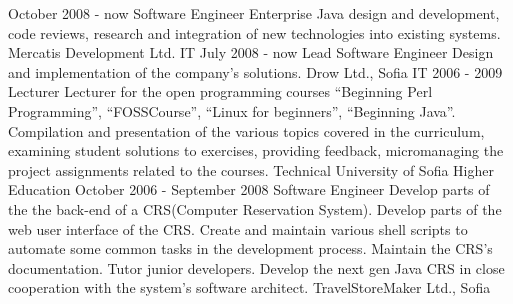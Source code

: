
{
  October 2008 - now
}
{
  Software Engineer
}
{
  Enterprise Java design and development, code reviews, research and
  integration of new technologies into existing systems.
}
{
  Mercatis Development Ltd.
}
{
  IT
}
\ecvitem{}{} %
\ecvitem{}{} %
{
  July 2008 - now
}
{
  Lead Software Engineer
}
{
  Design and implementation of the company's solutions.
}
{
  Drow Ltd., Sofia
}
{
  IT
}
\ecvitem{}{} %
\ecvitem{}{} %
{
  2006 - 2009
}
{
  Lecturer
}
{
  Lecturer for the open programming courses
  ``Beginning Perl Programming'', ``FOSSCourse'', ``Linux for
  beginners'', ``Beginning Java''. Compilation and presentation of the various topics covered in
  the curriculum, examining student solutions to exercises, providing
  feedback, micromanaging the project assignments related to the courses.
}
{
  Technical University of Sofia
}
{
  Higher Education
}
\ecvitem{}{} %
\ecvitem{}{} %
{
  October 2006 - September 2008
}
{
  Software Engineer
}
{
  Develop parts of the the back-end of a CRS(Computer
  Reservation System). Develop parts of the web user interface of the CRS. Create and maintain
  various shell scripts to automate some common tasks in the development process. Maintain the
  CRS's documentation. Tutor junior developers. Develop the next gen Java CRS in close cooperation
  with the system's software architect.
}
{
  TravelStoreMaker Ltd., Sofia
}
